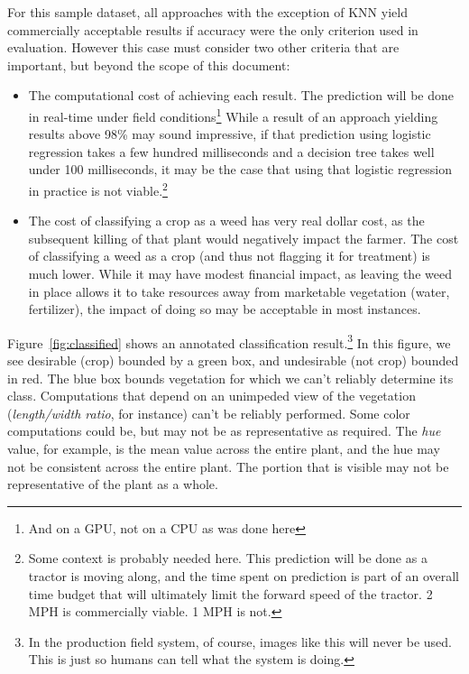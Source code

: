\documentclass[letterpaper]{article}
\begin{document}
{{For this sample dataset, all approaches with the exception of KNN yield commercially acceptable results if accuracy were the only criterion used in evaluation. However this case must consider two other criteria that are important, but beyond the scope of this document:
\begin{itemize}
\item{The computational cost of achieving each result. The prediction will be done in real-time under field conditions\footnote{And on a GPU, not on a CPU as was done here} While a result of an approach yielding results above 98\% may sound impressive, if that prediction using logistic regression takes a few hundred milliseconds and a decision tree takes well under 100 milliseconds, it may be the case that using that logistic regression in practice is not viable.\footnote{Some context is probably needed here. This prediction will be done as a tractor is moving along, and the time spent on prediction is part of an overall time budget that will ultimately limit the forward speed of the tractor. 2 MPH is commercially viable. 1 MPH is not.}}
\item{The cost of classifying a crop as a weed has very real dollar cost, as the subsequent killing of that plant would negatively impact the farmer. The cost of classifying a weed as a crop (and thus not flagging it for treatment) is much lower. While it may have modest financial impact, as leaving the weed in place allows it to take resources away from marketable vegetation (water, fertilizer), the impact of doing so may be acceptable in most instances.}
\end{itemize}
 
Figure~\ref{fig:classified} shows an annotated classification result.\footnote{In the production field system, of course, images like this will never be used.  This is just so humans can tell what the system is doing.} In this figure, we see desirable (crop) bounded by a green box, and undesirable (not crop) bounded in red. The blue box bounds vegetation for which we can't reliably determine its class. Computations that depend on an unimpeded view of the vegetation ({\it length/width ratio}, for instance) can't be reliably performed. Some color computations could be, but may not be as representative as required. The {\it hue} value, for example, is the mean value across the entire plant, and the hue may not be consistent across the entire plant. The portion that is visible may not be representative of the plant as a whole.

}}
\end{document}
